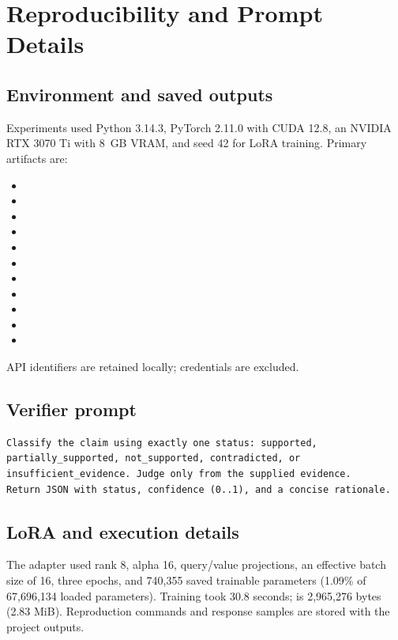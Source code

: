 \documentclass[12pt,toc=bib,toc=listof]{scrartcl}
\begin{document}
\clearpage
\appendix
\section{Reproducibility and Prompt Details}
\label{app:prompt}

\subsection{Environment and saved outputs}
Experiments used Python 3.14.3, PyTorch 2.11.0 with CUDA 12.8, an NVIDIA RTX 3070 Ti with 8~GB VRAM, and seed 42 for LoRA training. Primary artifacts are:
\begin{itemize}
  \item {}
  \item {}
  \item {}
  \item {}
  \item {}
  \item {}
  \item {}
  \item {}
  \item {}
  \item {}
  \item {}
\end{itemize}
API identifiers are retained locally; credentials are excluded.

\subsection{Verifier prompt}
\begin{verbatim}
Classify the claim using exactly one status: supported,
partially_supported, not_supported, contradicted, or
insufficient_evidence. Judge only from the supplied evidence.
Return JSON with status, confidence (0..1), and a concise rationale.
\end{verbatim}

\subsection{LoRA and execution details}
The adapter used rank 8, alpha 16, query/value projections, an effective batch size of 16, three epochs, and 740,355 saved trainable parameters (1.09\% of 67,696,134 loaded parameters). Training took 30.8 seconds;  is 2,965,276 bytes (2.83 MiB). Reproduction commands and response samples are stored with the project outputs.
\end{document}
